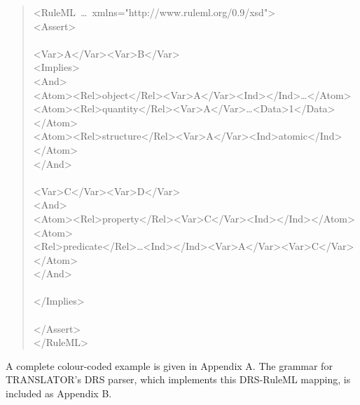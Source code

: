 \documentclass[12pt]{report}
\begin{document}
\begin{quote}
\small
\ttfamily
\setlength{\parindent}{0.1in}
<RuleML~\ldots~xmlns="http://www.ruleml.org/0.9/xsd">\\
\indent <Assert>\\
\indent \indent {}\\
\indent \indent \indent <Var>A</Var><Var>B</Var>\\
\indent \indent \indent <Implies>\\
\indent \indent \indent \indent <And>\\
\indent \indent \indent \indent \indent <Atom><Rel>object</Rel><Var>A</Var><Ind></Ind>\ldots</Atom>\\
\indent \indent \indent \indent \indent <Atom><Rel>quantity</Rel><Var>A</Var>\ldots<Data>1</Data></Atom>\\
\indent \indent \indent \indent \indent <Atom><Rel>structure</Rel><Var>A</Var><Ind>atomic</Ind></Atom>\\
\indent \indent \indent \indent </And>\\
\indent \indent \indent \indent {}\\
\indent \indent \indent \indent \indent <Var>C</Var><Var>D</Var>\\
\indent \indent \indent \indent \indent <And>\\
\indent \indent \indent \indent \indent \indent <Atom><Rel>property</Rel><Var>C</Var><Ind></Ind></Atom>\\
\indent \indent \indent \indent \indent \indent <Atom>\\
\indent \indent \indent \indent \indent  \indent \indent <Rel>predicate</Rel>\ldots<Ind></Ind><Var>A</Var><Var>C</Var>\\
\indent \indent \indent \indent \indent  \indent </Atom>\\
\indent \indent \indent \indent \indent </And>\\
\indent \indent \indent \indent {}\\
\indent \indent \indent </Implies>\\
\indent \indent {}\\
\indent </Assert>\\
</RuleML>
\setlength{\parindent}{0.0in}
\normalfont
\end{quote}

A complete colour-coded example is given in Appendix A. The grammar for TRANSLATOR's DRS parser, which implements this DRS-RuleML mapping, is included as Appendix B.
\end{document}
